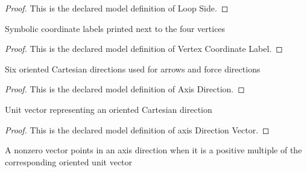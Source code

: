 \begin{proof}
  This is the declared model definition of Loop Side.
\end{proof}
\begin{definition}
  \label{def:physics:phyx-mini-0952:phyxminiproblems-problemphyxmini0952-vertexcoordinatelabel}
  Symbolic coordinate labels printed next to the four vertices
\end{definition}
\begin{proof}
  This is the declared model definition of Vertex Coordinate Label.
\end{proof}
\begin{definition}
  \label{def:physics:phyx-mini-0952:phyxminiproblems-problemphyxmini0952-axisdirection}
  Six oriented Cartesian directions used for arrows and force directions
\end{definition}
\begin{proof}
  This is the declared model definition of Axis Direction.
\end{proof}
\begin{definition}
  \label{def:physics:phyx-mini-0952:phyxminiproblems-problemphyxmini0952-axisdirectionvector}
  Unit vector representing an oriented Cartesian direction
\end{definition}
\begin{proof}
  This is the declared model definition of axis Direction Vector.
\end{proof}
\begin{definition}
  \label{def:physics:phyx-mini-0952:phyxminiproblems-problemphyxmini0952-pointsinaxisdirection}
  A nonzero vector points in an axis direction when it is a positive multiple of the corresponding oriented unit vector
\end{definition}
